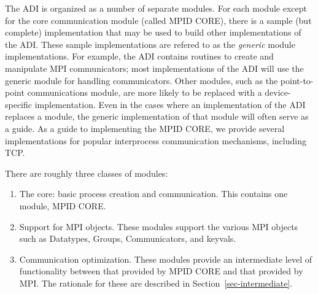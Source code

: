 \documentclass{article}
\begin{document}
The ADI is organized as a number of separate modules.
For each module except for the core communication module (called MPID
CORE), there is a sample (but complete) implementation that may be used to
build other implementations of the ADI.  These sample
implementations are refered to as the \emph{generic} module
implementations. For example,
the ADI contains routines to create and manipulate MPI communicators;
most implementations of the ADI will use the generic module for
handling communicators.  Other modules, such as the point-to-point
communications module, are more likely to be replaced with a
device-specific implementation.  Even in the cases where an
implementation of the ADI replaces a module, the generic
implementation of that module will often serve as a guide.
As a guide to implementing the MPID CORE, we provide several implementations
for popular interprocess communication mechanisms, including TCP.

There are roughly three classes of modules:
\begin{enumerate}
\item The core: basic process creation and communication. This
contains one module, MPID CORE. 
\item Support for MPI objects.  These modules support the various MPI
objects such as Datatypes, Groups, Communicators, and keyvals.
\item Communication optimization.  These modules provide an
intermediate level of functionality between that provided by MPID CORE
and that provided by MPI.  The rationale for these are described in
Section~\ref{sec-intermediate}. 
\end{enumerate}
\end{document}

